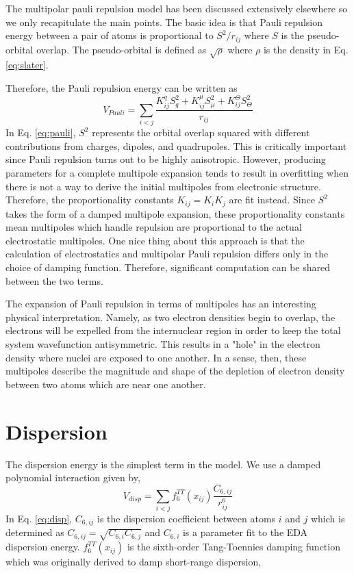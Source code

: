 \documentclass[journal=jacsat,manuscript=article]{achemso}
\begin{document}
The multipolar pauli repulsion model has been discussed extensively elsewhere\cite{rackers2019classical}
so we only recapitulate the main points. The basic idea is that Pauli repulsion energy
between a pair of atoms is proportional to $S^2/r_{ij}$ where $S$ is the pseudo-orbital
overlap. The pseudo-orbital is defined as $\sqrt{\rho}$ where $\rho$ is the density in Eq. \ref{eq:slater}.

Therefore, the Pauli repulsion energy can be written as
\begin{equation}
  V_{Pauli}=\sum_{i<j}\frac{K_{ij}^q S^2_{q}+K_{ij}^\mu S^2_{\mu}+K_{ij}^\Theta S^2_{\Theta}}{r_{ij}}
\label{eq:pauli}
\end{equation}
\noindent
In Eq. \ref{eq:pauli}, $S^2$ represents the orbital overlap squared with different contributions
from charges, dipoles, and quadrupoles. This is critically important since Pauli repulsion
turns out to be highly anisotropic. However, producing parameters for a complete multipole expansion
tends to result in overfitting when there is not a way to derive the initial multipoles
from electronic structure. Therefore, the proportionality constants $K_{ij}=K_iK_j$ are fit instead.
Since $S^2$ takes the form of a damped multipole expansion\cite{rackers2019classical}, these proportionality
constants mean multipoles which handle repulsion are proportional to the actual electrostatic
multipoles. One nice thing about this approach is that the calculation of electrostatics and
multipolar Pauli repulsion differs only in the choice of damping function. Therefore, significant
computation can be shared between the two terms.

The expansion of Pauli repulsion in terms of multipoles has an interesting physical interpretation.
Namely, as two electron densities begin to overlap, the electrons will be expelled
from the internuclear region in order to keep the total system wavefunction antisymmetric.
This results in a "hole" in the electron density where nuclei are exposed to one another.
In a sense, then, these multipoles describe the magnitude and shape of the depletion of electron density
between two atoms which are near one another.

\section*{Dispersion}

The dispersion energy is the simplest term in the model. We use a damped
polynomial interaction given by,
\begin{equation}
  V_{disp}=\sum_{i<j}f_6^{TT}(x_{ij})\frac{C_{6,ij}}{r_{ij}^6}
  \label{eq:disp}
\end{equation}
\noindent
In Eq. \ref{eq:disp}, $C_{6,ij}$ is the dispersion coefficient between atoms
$i$ and $j$ which is determined as $C_{6,ij}=\sqrt{C_{6,i}C_{6,j}}$ and $C_{6,i}$ is
a parameter fit to the EDA dispersion energy. $f_6^{TT}(x_{ij})$ is the sixth-order
Tang-Toennies damping function\cite{tang1984improved} which was originally derived
to damp short-range dispersion,
\end{document}
